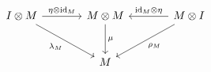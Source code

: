 \documentclass[border=6pt]{standalone}
\newcommand{\id}{\mathrm{id}}
\begin{document}
$
\begin{tikzcd}[column sep=large, row sep=large]
  I \otimes M \arrow[r, "\eta \otimes \id_M"] \arrow[dr, "\lambda_M"'] & M \otimes M \arrow[d, "\mu"] & M \otimes I \arrow[l, "\id_M \otimes \eta"'] \arrow[dl, "\rho_M"] \\
  & M &
\end{tikzcd}
$
\end{document}
